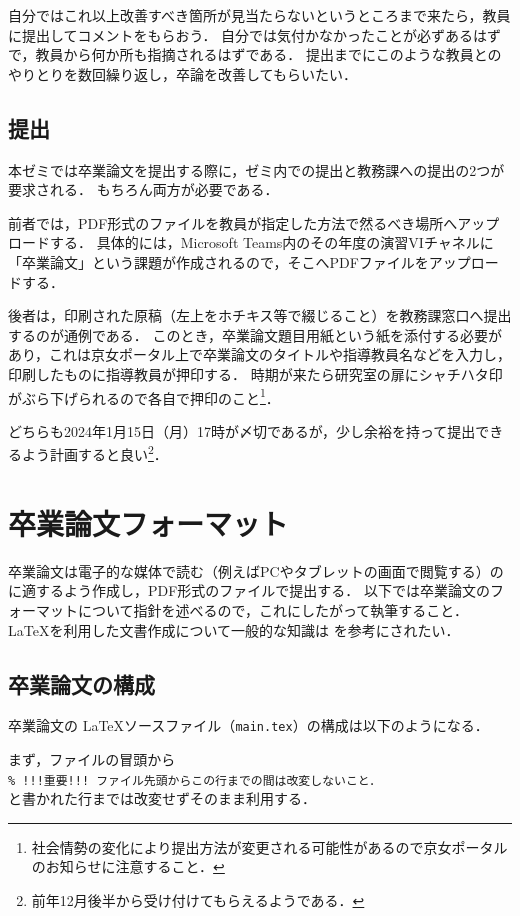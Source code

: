 \documentclass[a4paper,twocolumn,10pt]{jsarticle}
\begin{document}
自分ではこれ以上改善すべき箇所が見当たらないというところまで来たら，教員に提出してコメントをもらおう．
自分では気付かなかったことが必ずあるはずで，教員から何か所も指摘されるはずである．
提出までにこのような教員とのやりとりを数回繰り返し，卒論を改善してもらいたい．

\subsection{提出}

本ゼミでは卒業論文を提出する際に，ゼミ内での提出と教務課への提出の2つが要求される．
もちろん両方が必要である．

前者では，PDF形式のファイルを教員が指定した方法で然るべき場所へアップロードする．
具体的には，Microsoft Teams内のその年度の演習VIチャネルに「卒業論文」という課題が作成されるので，そこへPDFファイルをアップロードする．

後者は，印刷された原稿（左上をホチキス等で綴じること）を教務課窓口へ提出するのが通例である．
このとき，卒業論文題目用紙という紙を添付する必要があり，これは京女ポータル上で卒業論文のタイトルや指導教員名などを入力し，印刷したものに指導教員が押印する．
時期が来たら研究室の扉にシャチハタ印がぶら下げられるので各自で押印のこと\footnote{社会情勢の変化により提出方法が変更される可能性があるので京女ポータルのお知らせに注意すること．}．

どちらも2024年1月15日（月）17時が〆切であるが，少し余裕を持って提出できるよう計画すると良い\footnote{前年12月後半から受け付けてもらえるようである．}．

\section{卒業論文フォーマット}
\label{sec:format}

卒業論文は電子的な媒体で読む（例えばPCやタブレットの画面で閲覧する）のに適するよう作成し，PDF形式のファイルで提出する．
以下では卒業論文のフォーマットについて指針を述べるので，これにしたがって執筆すること．
\LaTeX を利用した文書作成について一般的な知識は \cite{okumura2020} を参考にされたい．

\subsection{卒業論文の構成}

卒業論文の \LaTeX ソースファイル（{\tt main.tex}）の構成は以下のようになる．

まず，ファイルの冒頭から\\
\verb|% !!!重要!!! ファイル先頭からこの行までの間は改変しないこと．|\\
と書かれた行までは改変せずそのまま利用する．
\end{document}
